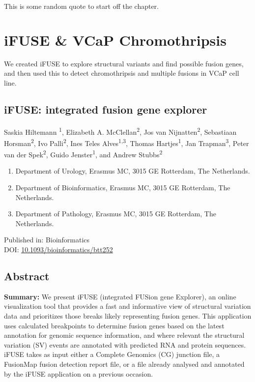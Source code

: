 \begin{savequote}[75mm]
This is some random quote to start off the chapter.
\end{savequote}

\chapter{iFUSE \& VCaP Chromothripsis}
\setcounter{figure}{-1}
\setcounter{table}{-1}
\setcounter{section}{-1}

We created iFUSE to explore structural variants and find possible fusion genes, and then used this to detect chromothripsis and multiple fusions in VCaP cell line.

%
\newpage
\section*{iFUSE: integrated fusion gene explorer}
Saskia Hiltemann \textsuperscript{1}, Elizabeth A. McClellan\textsuperscript{2}, Jos van Nijnatten\textsuperscript{2}, Sebastiaan Horsman\textsuperscript{2}, Ivo Palli\textsuperscript{2}, Ines Teles Alves\textsuperscript{1,3}, Thomas Hartjes\textsuperscript{1}, Jan Trapman\textsuperscript{3}, Peter van der Spek\textsuperscript{2}, Guido Jenster\textsuperscript{1}, and Andrew Stubbs\textsuperscript{2}

\small
\begin{enumerate}
\itemsep-0.5em
\item Department of Urology, Erasmus MC, 3015 GE Rotterdam, The Netherlands.
\item Department of Bioinformatics, Erasmus MC, 3015 GE Rotterdam, The Netherlands.
\item Department of Pathology, Erasmus MC, 3015 GE Rotterdam, The Netherlands.
\end{enumerate}

Published in: Bioinformatics \\
DOI: \url{10.1093/bioinformatics/btt252} \\

\section*{Abstract}

\textbf{Summary:} We present iFUSE (integrated FUSion gene Explorer), an online visualization tool that provides a fast and informative view of structural variation data and prioritizes those breaks likely representing fusion genes. \color{black} This application uses calculated breakpoints to determine fusion genes based on the latest annotation for genomic sequence information, and where relevant the structural variation (SV) events are annotated with predicted RNA and protein sequences. iFUSE takes as input either a Complete Genomics (CG) junction file, a FusionMap \cite{fusionmap} fusion detection report file, or a file already analysed and annotated by the iFUSE application on a previous occasion.

